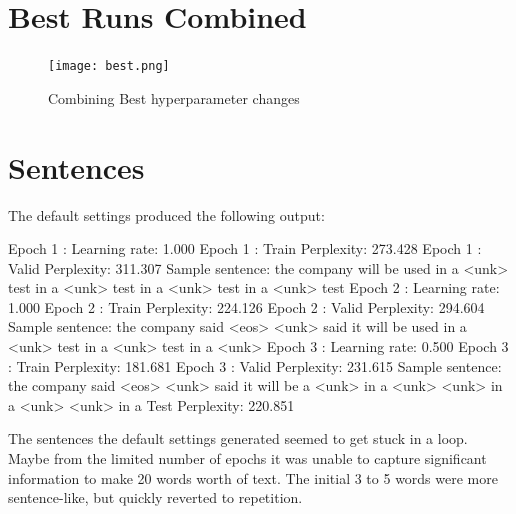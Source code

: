 \documentclass[10pt,a4paper]{article}
\begin{document}
\clearpage

\section{Best Runs Combined}


\begin{figure}[t]
  \begin{center}
    \texttt{[image: best.png]}
    \caption{Combining Best hyperparameter changes}
  \end{center}
\end{figure}


\section{Sentences}

The default settings produced the following output:

Epoch 1 : Learning rate: 1.000
Epoch 1 : Train Perplexity: 273.428
Epoch 1 : Valid Perplexity: 311.307
Sample sentence: the company will be used in a <unk> test in a <unk> test in a <unk> test in a <unk> test
Epoch 2 : Learning rate: 1.000
Epoch 2 : Train Perplexity: 224.126
Epoch 2 : Valid Perplexity: 294.604
Sample sentence: the company said <eos> <unk> said it will be used in a <unk> test in a <unk> test in a <unk>
Epoch 3 : Learning rate: 0.500
Epoch 3 : Train Perplexity: 181.681
Epoch 3 : Valid Perplexity: 231.615
Sample sentence: the company said <eos> <unk> said it will be a <unk> in a <unk> <unk> in a <unk> <unk> in a
Test Perplexity: 220.851

The sentences the default settings generated seemed to get stuck in a loop. Maybe from the limited number of epochs it was unable to capture significant information to make 20 words worth of text. The initial 3 to 5 words were more sentence-like, but quickly reverted to repetition.
\end{document}
